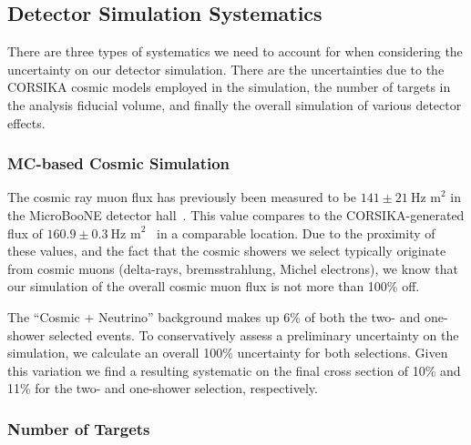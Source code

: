 \clearpage
\subsection{Detector Simulation Systematics}

There are three types of systematics we need to account for when considering the uncertainty on our detector simulation.  There are the uncertainties due to the CORSIKA cosmic models employed in the simulation, the number of targets in the analysis fiducial volume, and finally the overall simulation of various detector effects. 

\subsubsection{MC-based Cosmic Simulation}\label{sec:cosuncert}
 The cosmic ray muon flux has previously been measured to be $141\pm21~\text{Hz~m}^2$ in the MicroBooNE detector hall~\cite{datacosflux}.  This value compares to the CORSIKA-generated flux of $160.9\pm0.3~\text{Hz~m}^2$~\cite{mccosflux} in a comparable location.  Due to the proximity of these values, and the fact that the cosmic showers we select typically originate from cosmic muons (delta-rays, bremsstrahlung, Michel electrons), we know that our simulation of the overall cosmic muon flux is not more than 100\% off.
\par The ``Cosmic + Neutrino'' background makes up 6\% of both the two- and one-shower selected events. To conservatively assess a preliminary uncertainty on the simulation, we calculate an overall 100\% uncertainty for both selections. Given this variation we find a resulting systematic on the final cross section of 10\% and 11\% for the two- and one-shower selection, respectively. 
 
\subsubsection{Number of Targets}\label{sec:ntarguncert}


